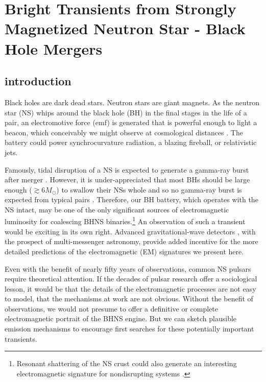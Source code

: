 \chapter[Bright Transients from Black Hole - Neutron Star Mergers]{Bright Transients from Strongly Magnetized Neutron Star - Black Hole Mergers }
\label{ch:NSBH_Fireball}
\let\thefootnote\relax{}



\section{introduction}
Black holes are dark dead stars. Neutron stars are giant magnets. As
the neutron star (NS) whips around the black hole (BH) in the final
stages in the life of a pair, an electromotive force (emf) is
generated that is powerful enough to light a beacon, which conceivably we
might observe at cosmological distances
\citep{McL:2011,DL:2013}. The battery could power
synchrocurvature radiation, a blazing fireball, or relativistic jets.


Famously, tidal disruption of a NS is expected to generate a gamma-ray
burst after merger \citep{NPP:NSBH_GRB:1992}. However, it is
under-appreciated that most BHs should be large enough ($\gtrsim
6M_\odot $) to swallow their NSs whole and so no gamma-ray burst is
expected from typical pairs \citep{Ozel:2010}. Therefore, our BH
battery, which operates with the NS intact, may be one of the only
significant sources of electromagnetic luminosity for coalescing BHNS binaries.\footnote{Resonant shattering of the NS crust could also generate an interesting electromagnetic 
signature for nondisrupting systems \citep{Tsang:2012, Tsang:2013}.}
% 
An observation of such a transient would be exciting in its own right.
Advanced gravitational-wave detectors \citep[{\em
    e.g.},][]{AdLIGO:2010}, with the prospect of multi-messenger
astronomy, provide added incentive for the more detailed predictions
of the electromagnetic (EM) signatures we present here.

Even with the benefit of nearly fifty years of observations, common NS
pulsars require theoretical attention. If the decades of pulsar
research offer a sociological lesson, it would be that the details of
the electromagnetic processes are not easy to model, that the
mechanisms at work are not obvious. Without the benefit of
observations, we would not presume to offer a definitive or complete
electromagnetic portrait of the BHNS engine. But we can sketch
plausible emission mechanisms to encourage first searches for these
potentially important transients.



